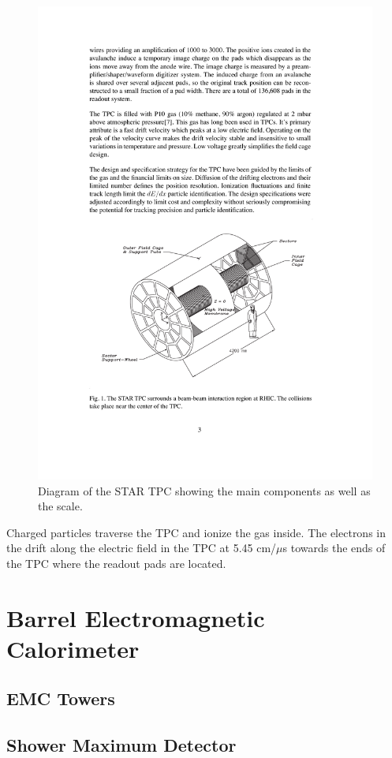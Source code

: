 \begin{figure}[htbp]
\begin{center}
\includegraphics[scale=1.0]{Plots/Detector/TPC.pdf}
\end{center}
\caption[TPC Diagram]{Diagram of the STAR TPC showing the main components as well as the scale.}
\label{fig:TPC}
\end{figure}

Charged particles traverse the TPC and ionize the gas inside. The electrons in the drift along the electric field in the TPC at 5.45 cm/$\mu$s towards the ends of the TPC where the readout pads are located.  

\section{Barrel Electromagnetic Calorimeter}

\subsection{EMC Towers}

\subsection{Shower Maximum Detector}
